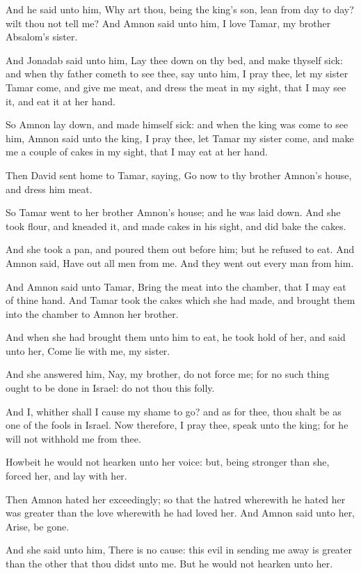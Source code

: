 \Verse And he said unto him, Why art thou, being the king's son, lean from day to day? wilt thou not tell me? And Amnon said unto him, I love Tamar, my brother Absalom's sister.

\Verse And Jonadab said unto him, Lay thee down on thy bed, and make thyself sick: and when thy father cometh to see thee, say unto him, I pray thee, let my sister Tamar come, and give me meat, and dress the meat in my sight, that I may see it, and eat it at her hand.

\Verse So Amnon lay down, and made himself sick: and when the king was come to see him, Amnon said unto the king, I pray thee, let Tamar my sister come, and make me a couple of cakes in my sight, that I may eat at her hand.

\Verse Then David sent home to Tamar, saying, Go now to thy brother Amnon's house, and dress him meat.

\Verse So Tamar went to her brother Amnon's house; and he was laid down.  And she took flour, and kneaded it, and made cakes in his sight, and did bake the cakes.

\Verse And she took a pan, and poured them out before him; but he refused to eat. And Amnon said, Have out all men from me. And they went out every man from him.

\Verse And Amnon said unto Tamar, Bring the meat into the chamber, that I may eat of thine hand. And Tamar took the cakes which she had made, and brought them into the chamber to Amnon her brother.

\Verse And when she had brought them unto him to eat, he took hold of her, and said unto her, Come lie with me, my sister.

\Verse And she answered him, Nay, my brother, do not force me; for no such thing ought to be done in Israel: do not thou this folly.

\Verse And I, whither shall I cause my shame to go? and as for thee, thou shalt be as one of the fools in Israel. Now therefore, I pray thee, speak unto the king; for he will not withhold me from thee.

\Verse Howbeit he would not hearken unto her voice: but, being stronger than she, forced her, and lay with her.

\Verse Then Amnon hated her exceedingly; so that the hatred wherewith he hated her was greater than the love wherewith he had loved her. And Amnon said unto her, Arise, be gone.

\Verse And she said unto him, There is no cause: this evil in sending me away is greater than the other that thou didst unto me. But he would not hearken unto her.

